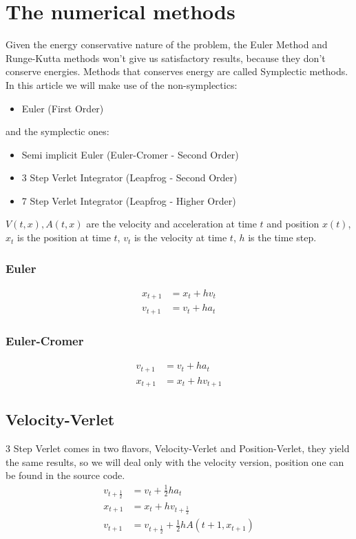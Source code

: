 \documentclass[12pt]{article}
\begin{document}
\section{The numerical methods}
Given the energy conservative nature of the problem, the Euler Method and Runge-Kutta methods won't give us satisfactory results, because they don't conserve energies. Methods that conserves energy are called Symplectic methods.
In this article we will make use of the non-symplectics:
\begin{itemize}
  \item Euler (First Order)
\end{itemize}
 and the symplectic ones:
 \begin{itemize}
   \item Semi implicit Euler (Euler-Cromer - Second Order)
   \item 3 Step Verlet Integrator (Leapfrog - Second Order)
   \item 7 Step Verlet Integrator (Leapfrog - Higher Order)
 \end{itemize}
  \(V(t, x), A(t, x)\) are the velocity and acceleration at time \(t\) and position \(x(t)\), \(x_t\) is the position at time \(t\), \(v_t\) is the velocity at time \(t \), \(h\) is the time step.
 \subsubsection{Euler}
 \begin{align*}
   x_{t+1} &= x_t + h v_t\\
   v_{t+1} &= v_t + h a_t
 \end{align*}
 \subsubsection{Euler-Cromer}
 \begin{align*}
  v_{t+1} &= v_t + h a_t \\
  x_{t+1} &= x_t + h v_{t+1}
 \end{align*}
 \subsection{Velocity-Verlet}
 3 Step Verlet comes in two flavors, Velocity-Verlet and Position-Verlet, they yield the same results, so we will deal only with the velocity version, position one can be found in the source code.\\
 \begin{align*}
  v_{t+\frac{1}{2}} &= v_t + \frac{1}{2} h a_t \\
  x_{t+1} &= x_t + h v_{t+\frac{1}{2}}\\
  v_{t+1} &= v_{t+\frac{1}{2}} + \frac{1}{2} h A(t+1, x_{t+1})
 \end{align*}
\end{document}
